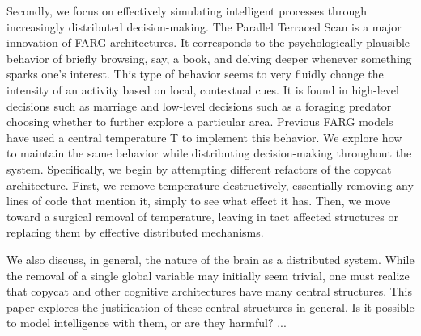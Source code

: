 \documentclass[a4paper]{article}
\begin{document}
    Secondly, we focus on effectively simulating intelligent processes through increasingly distributed decision-making.
    The Parallel Terraced Scan is a major innovation of FARG architectures. 
    It corresponds to the psychologically-plausible behavior of briefly browsing, say, a book, and delving deeper whenever something sparks one's interest. 
    This type of behavior seems to very fluidly change the intensity of an activity based on local, contextual cues. 
    It is found in high-level decisions such as marriage and low-level decisions such as a foraging predator choosing whether to further explore a particular area. 
    Previous FARG models have used a central temperature T to implement this behavior. 
    We explore how to maintain the same behavior while distributing decision-making throughout the system.
    Specifically, we begin by attempting different refactors of the copycat architecture.
    First, we remove temperature destructively, essentially removing any lines of code that mention it, simply to see what effect it has.
    Then, we move toward a surgical removal of temperature, leaving in tact affected structures or replacing them by effective distributed mechanisms.

    We also discuss, in general, the nature of the brain as a distributed system.
    While the removal of a single global variable may initially seem trivial, one must realize that copycat and other cognitive architectures have many central structures.
    This paper explores the justification of these central structures in general.
    Is it possible to model intelligence with them, or are they harmful?
    ...




\end{document}
